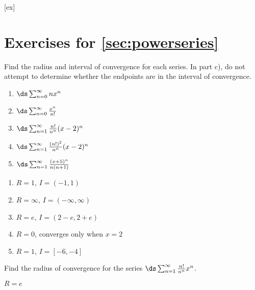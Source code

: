 [ex]
\section*{Exercises for \ref{sec:powerseries}}

\begin{enumialphparenastyle}

\begin{ex}
Find the radius and interval of convergence for each series.  In
part c),
do not attempt to determine whether the endpoints are in the
interval of convergence.

\begin{multicols}{2}
\begin{enumerate}
	\item $\ds\sum_{n=0}^\infty n x^n$
	\item $\ds\sum_{n=0}^\infty {x^n\over n!}$
	\item $\ds\sum_{n=1}^\infty {n!\over n^n}(x-2)^n$
	\item $\ds\sum_{n=1}^\infty {(n!)^2\over n^n}(x-2)^n$
	\item $\ds\sum_{n=1}^\infty {(x+5)^n\over n(n+1)}$
\end{enumerate}
\end{multicols}
\begin{sol}
\begin{enumerate}
	\item $R=1$, $I=(-1,1)$
	\item $R=\infty$, $I=(-\infty,\infty)$
	\item $R=e$, $I=(2-e,2+e)$
	\item $R=0$, converges only when $x=2$
	\item $R=1$, $I=[-6,-4]$
\end{enumerate}
\end{sol}
\end{ex}

\begin{ex}
Find the radius of convergence for the series $\ds\sum_{n=1}^\infty {n!\over n^n}x^n$.
\begin{sol}
$R=e$
\end{sol}
\end{ex}

\end{enumialphparenastyle}

\clearpage